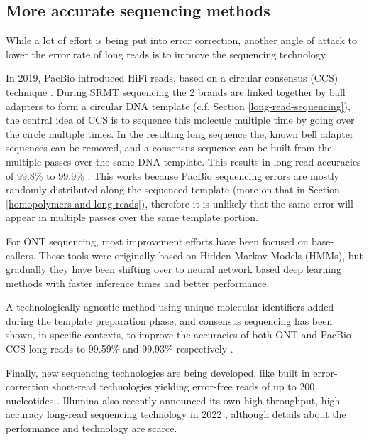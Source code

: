 \documentclass[
  11pt,
  twoside]{scrbook}
\begin{document}
\hypertarget{more-accurate-sequencing-methods}{%
\subsection{More accurate sequencing methods}\label{more-accurate-sequencing-methods}}

While a lot of effort is being put into error correction, another angle of attack to lower the error rate of long reads is to improve the sequencing technology.

In 2019, PacBio introduced HiFi reads, based on a circular consensus (CCS) technique \autocite{wenger2019}. During SRMT sequencing the 2 brands are linked together by ball adapters to form a circular DNA template (c.f. Section \ref{long-read-sequencing}), the central idea of CCS is to sequence this molecule multiple time by going over the circle multiple times. In the resulting long sequence the, known bell adapter sequences can be removed, and a consensus sequence can be built from the multiple passes over the same DNA template. This results in long-read accuracies of 99.8\% to 99.9\% \autocite{wenger2019,logsdonLongreadHumanGenome2020}. This works because PacBio sequencing errors are mostly randomly distributed along the sequenced template (more on that in Section \ref{homopolymers-and-long-reads}), therefore it is unlikely that the same error will appear in multiple passes over the same template portion.

For ONT sequencing, most improvement efforts have been focused on base-callers. These tools were originally based on Hidden Markov Models \autocite{timpDNABaseCallingNanopore2012} (HMMs), but gradually they have been shifting over to neural network based deep learning methods \autocite{peresiniNanoporeBaseCalling2021,bozaDeepNanoDeepRecurrent2017,wickPerformanceNeuralNetwork2019,amarasingheOpportunitiesChallengesLongread2020} with faster inference times and better performance.

A technologically agnostic method using unique molecular identifiers added during the template preparation phase, and consensus sequencing has been shown, in specific contexts, to improve the accuracies of both ONT and PacBio CCS long reads to 99.59\% and 99.93\% respectively \autocite{karstHighaccuracyLongreadAmplicon2021}.

Finally, new sequencing technologies are being developed, like built in error-correction short-read technologies yielding error-free reads of up to 200 nucleotides \autocite{chenHighlyAccurateFluorogenic2017}. Illumina also recently announced its own high-throughput, high-accuracy long-read sequencing technology in 2022 \autocite{HighPerformanceLong}, although details about the performance and technology are scarce.
\end{document}

